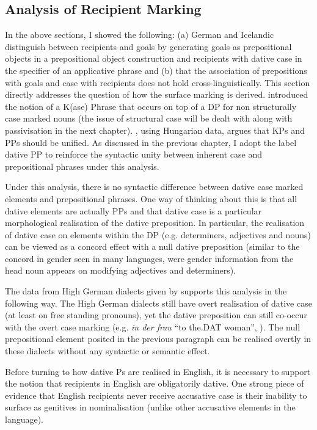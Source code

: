 	\subsection{Analysis of Recipient Marking}
	In the above sections, I showed the following: (a) German and Icelandic distinguish between recipients and goals by generating goals as prepositional objects in a prepositional object construction and recipients with dative case in the specifier of an applicative phrase and (b) that the association of prepositions with goals and case with recipients does not hold cross-linguistically. This section directly addresses the question of how the surface marking is derived. \cite{Bayer.2001} introduced the notion of a K(ase) Phrase that occurs on top of a DP for non structurally case marked nouns (the issue of structural case will be dealt with along with passivisation in the next chapter). \cite{Asbury.2007}, using Hungarian data, argues that KPs and PPs should be unified. As discussed in the previous chapter, I adopt the label dative PP to reinforce the syntactic unity between inherent case and prepositional phrases under this analysis.

	Under this analysis, there is no syntactic difference between dative case marked elements and prepositional phrases. One way of thinking about this is that all dative elements are actually PPs \citep{Bittner.1996,Caha.2009,Alexiadou.2014} and that dative case is a particular morphological realisation of the dative preposition. In particular, the realisation of dative case on elements within the DP (e.g. determiners, adjectives and nouns) can be viewed as a concord effect with a null dative preposition (similar to the concord in gender seen in many languages, were gender information from the head noun appears on modifying adjectives and determiners).

	The data from High German dialects given by \cite{Seiler.2001,Seiler.2003} supports this analysis in the following way. The High German dialects still have overt realisation of dative case (at least on free standing pronouns), yet the dative preposition can still co-occur with the overt case marking (e.g. \textit{in der frau} ``to the.DAT woman'', \citealt[ex 3]{Seiler.2001}). The null prepositional element posited in the previous paragraph can be realised overtly in these dialects without any syntactic or semantic effect.

	Before turning to how dative Ps are realised in English, it is necessary to support the notion that recipients in English are obligatorily dative. One strong piece of evidence that English recipients never receive accusative case is their inability to surface as genitives in nominalisation (unlike other accusative elements in the language).

